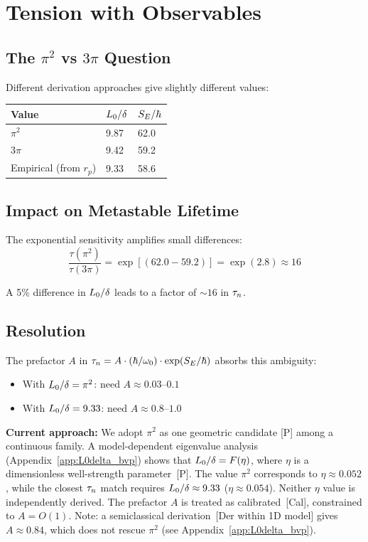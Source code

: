 \section{Tension with Observables}
\label{sec:L0delta:tension}

\subsection{The $\pi^2$ vs $3\pi$ Question}

Different derivation approaches give slightly different values:
\begin{center}
\begin{tabular}{lll}
\toprule
Value & $L_0/\delta$ & $S_E/\hbar$ \\
\midrule
$\pi^2$ & 9.87 & 62.0 \\
$3\pi$ & 9.42 & 59.2 \\
Empirical (from $r_p$) & 9.33 & 58.6 \\
\bottomrule
\end{tabular}
\end{center}

\subsection{Impact on Metastable Lifetime}

The exponential sensitivity amplifies small differences:
\begin{equation}
    \frac{\tau(\pi^2)}{\tau(3\pi)} = \exp[(62.0 - 59.2)] = \exp(2.8) \approx 16
\end{equation}

A 5\% difference in $L_0/\delta$ leads to a factor of $\sim 16$ in $\tau_n$.

\subsection{Resolution}

The prefactor $A$ in $\tau_n = A \cdot (\hbar/\omega_0) \cdot \exp(S_E/\hbar)$
absorbs this ambiguity:
\begin{itemize}
    \item With $L_0/\delta = \pi^2$: need $A \approx 0.03$--$0.1$
    \item With $L_0/\delta = 9.33$: need $A \approx 0.8$--$1.0$
\end{itemize}

\textbf{Current approach:} We adopt $\pi^2$ as one geometric candidate [P] among
a continuous family. A model-dependent eigenvalue analysis
(Appendix~\ref{app:L0delta_bvp}) shows that $L_0/\delta = F(\eta)$, where
$\eta$ is a dimensionless well-strength parameter~[P]. The value $\pi^2$
corresponds to $\eta \approx 0.052$, while the closest $\tau_n$ match requires
$L_0/\delta \approx 9.33$ ($\eta \approx 0.054$). Neither $\eta$ value is
independently derived. The prefactor $A$ is treated as calibrated~[Cal],
constrained to $A = O(1)$. Note: a semiclassical derivation~[Der within 1D
model] gives $A \approx 0.84$, which does not rescue $\pi^2$ (see
Appendix~\ref{app:L0delta_bvp}).

